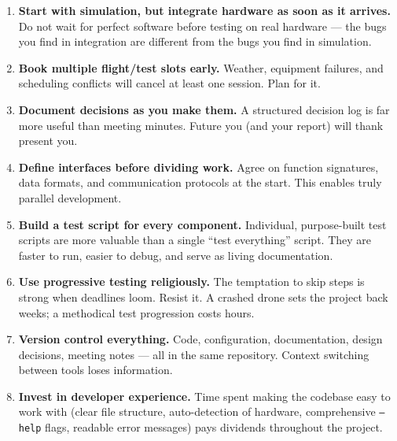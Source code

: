\begin{enumerate}
  \item \textbf{Start with simulation, but integrate hardware as soon as it arrives.} Do not wait for perfect software before testing on real hardware --- the bugs you find in integration are different from the bugs you find in simulation.

  \item \textbf{Book multiple flight/test slots early.} Weather, equipment failures, and scheduling conflicts will cancel at least one session. Plan for it.

  \item \textbf{Document decisions as you make them.} A structured decision log is far more useful than meeting minutes. Future you (and your report) will thank present you.

  \item \textbf{Define interfaces before dividing work.} Agree on function signatures, data formats, and communication protocols at the start. This enables truly parallel development.

  \item \textbf{Build a test script for every component.} Individual, purpose-built test scripts are more valuable than a single ``test everything'' script. They are faster to run, easier to debug, and serve as living documentation.

  \item \textbf{Use progressive testing religiously.} The temptation to skip steps is strong when deadlines loom. Resist it. A crashed drone sets the project back weeks; a methodical test progression costs hours.

  \item \textbf{Version control everything.} Code, configuration, documentation, design decisions, meeting notes --- all in the same repository. Context switching between tools loses information.

  \item \textbf{Invest in developer experience.} Time spent making the codebase easy to work with (clear file structure, auto-detection of hardware, comprehensive \texttt{--help} flags, readable error messages) pays dividends throughout the project.
\end{enumerate}
